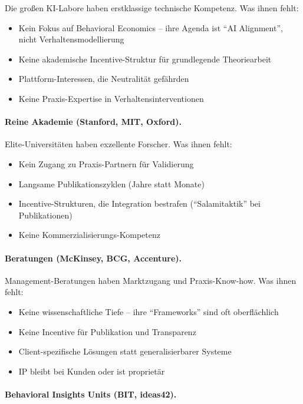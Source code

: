 Die großen KI-Labore haben erstklassige technische Kompetenz. Was ihnen fehlt:
\begin{itemize}
    \item Kein Fokus auf Behavioral Economics -- ihre Agenda ist ``AI Alignment'', nicht Verhaltensmodellierung
    \item Keine akademische Incentive-Struktur für grundlegende Theoriearbeit
    \item Plattform-Interessen, die Neutralität gefährden
    \item Keine Praxis-Expertise in Verhaltensinterventionen
\end{itemize}

\paragraph{Reine Akademie (Stanford, MIT, Oxford).}

Elite-Universitäten haben exzellente Forscher. Was ihnen fehlt:
\begin{itemize}
    \item Kein Zugang zu Praxis-Partnern für Validierung
    \item Langsame Publikationszyklen (Jahre statt Monate)
    \item Incentive-Strukturen, die Integration bestrafen (``Salamitaktik'' bei Publikationen)
    \item Keine Kommerzialisierungs-Kompetenz
\end{itemize}

\paragraph{Beratungen (McKinsey, BCG, Accenture).}

Management-Beratungen haben Marktzugang und Praxis-Know-how. Was ihnen fehlt:
\begin{itemize}
    \item Keine wissenschaftliche Tiefe -- ihre ``Frameworks'' sind oft oberflächlich
    \item Keine Incentive für Publikation und Transparenz
    \item Client-spezifische Lösungen statt generalisierbarer Systeme
    \item IP bleibt bei Kunden oder ist proprietär
\end{itemize}

\paragraph{Behavioral Insights Units (BIT, ideas42).}

